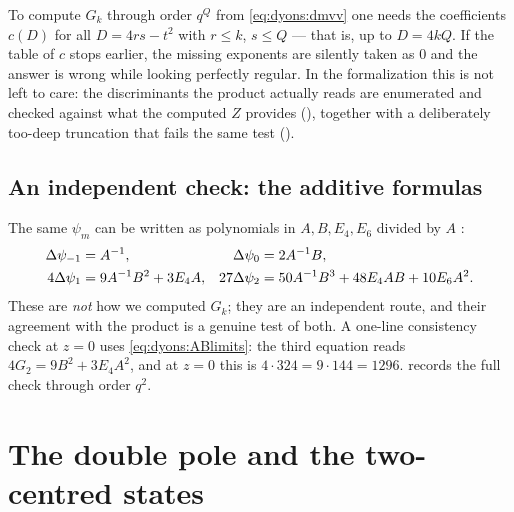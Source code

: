 \begin{pitfallbox}
To compute $G_k$ through order $q^Q$ from \eqref{eq:dyons:dmvv} one needs the coefficients
$c(D)$ for all $D=4rs-t^2$ with $r\le k$, $s\le Q$ --- that is, up to $D=4kQ$. If the table of
$c$ stops earlier, the missing exponents are silently taken as $0$ and the answer is wrong
while looking perfectly regular. In the formalization this is not left to care: the
discriminants the product actually reads are enumerated and checked against what the computed
$Z$ provides (), together with a deliberately too-deep truncation that
fails the same test ().
\end{pitfallbox}

\subsection*{An independent check: the additive formulas}

The same $\psi_m$ can be written as polynomials in $A,B,E_4,E_6$ divided by $A$
:
\begin{align}\label{eq:dyons:516}
  \Delta\psi_{-1}&=A^{-1}, &
  \Delta\psi_{0}&=2A^{-1}B, \notag\\
  4\Delta\psi_{1}&=9A^{-1}B^2+3E_4A, &
  27\Delta\psi_{2}&=50A^{-1}B^3+48E_4AB+10E_6A^2 .
\end{align}
These are \emph{not} how we computed $G_k$; they are an independent route, and their agreement
with the product is a genuine test of both. A one-line consistency check at $z=0$ uses
\eqref{eq:dyons:ABlimits}: the third equation reads $4G_2=9B^2+3E_4A^2$, and at $z=0$ this is
$4\cdot324=9\cdot144=1296$.  records the full check through order $q^2$.

\section{The double pole and the two-centred states}\label{sec:dyons:polar}

